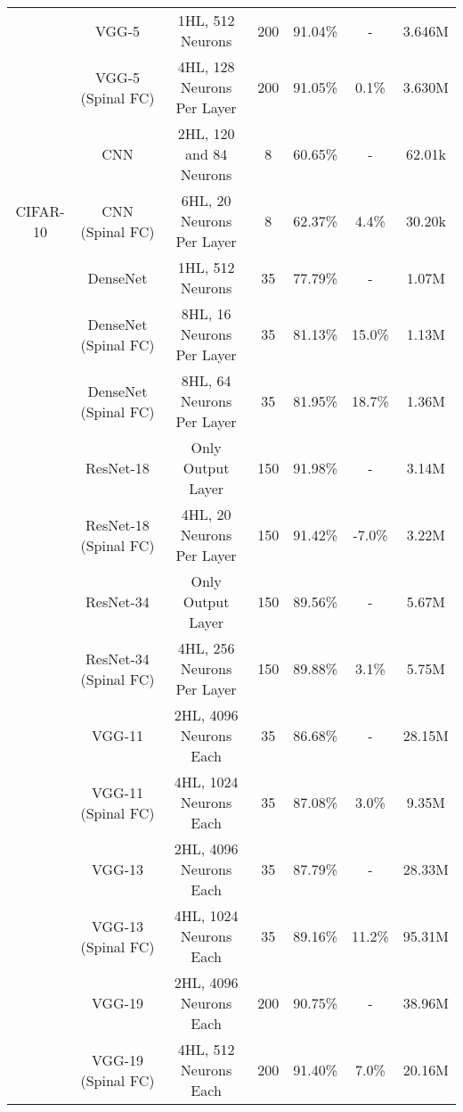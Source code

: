 \documentclass[journal]{IEEEtran}
\begin{document}
\begin{table*}
\begin{tabular}{|c|c|c|c|c|c|c|}
      & VGG-5\cite{VGG5} & 1HL, 512 Neurons &200 &91.04\%&- &3.646M\\ \cline{2-7}
      & VGG-5 (Spinal FC) & 4HL, 128 Neurons Per Layer & 200 &91.05\% & 0.1\% &3.630M\\ \hline \hline
      
      
      
      
      
      
      
      
      
      
      & CNN\cite{CR_CNN2}& 2HL, 120 and 84 Neurons & 8 &60.65\% &- &62.01k\\ \cline{2-7}
CIFAR-10      & CNN (Spinal FC) & 6HL, 20 Neurons Per Layer& 8 &62.37\%&4.4\% &30.20k\\ \cline{2-7}
      
 \cite{krizhevsky2009learning}  & DenseNet\cite{DenseNet_code} & 1HL, 512 Neurons& 35 &77.79\%&- & 1.07M \\ \cline{2-7}  
      & DenseNet (Spinal FC) &8HL, 16 Neurons Per Layer& 35 &81.13\%&15.0\% &1.13M\\ \cline{2-7}  
 & DenseNet (Spinal FC) &8HL, 64 Neurons Per Layer& 35 &81.95\%&18.7\% & 1.36M\\ \cline{2-7} 
      
 
   & ResNet-18 \cite{he2016deep}&Only Output Layer&150 &91.98\%&- &3.14M\\ \cline{2-7}
 & ResNet-18 (Spinal FC) & 4HL, 20 Neurons Per Layer &150 &91.42\%  & -7.0\% &3.22M\\ \cline{2-7}
    & ResNet-34 \cite{he2016deep}&Only Output Layer&150 &89.56\%&- &5.67M \\ \cline{2-7}
 & ResNet-34 (Spinal FC) & 4HL, 256 Neurons Per Layer &150 &89.88\%  & 3.1\% &5.75M\\ \cline{2-7}
& VGG-11\cite{simonyan2014very} & 2HL, 4096 Neurons Each &35 &86.68\% &- &28.15M\\ \cline{2-7} 
    & VGG-11 (Spinal FC) &4HL, 1024 Neurons Each &35 &87.08\%&3.0\% &9.35M\\ \cline{2-7} 

    & VGG-13\cite{simonyan2014very} & 2HL, 4096 Neurons Each &35 &87.79\% &- &28.33M\\ \cline{2-7} 
    & VGG-13 (Spinal FC) &4HL, 1024 Neurons Each &35 &89.16\%&11.2\% &95.31M \\ \cline{2-7}      
      & VGG-19\cite{simonyan2014very} & 2HL, 4096 Neurons Each &200 &90.75\% &-&38.96M\\ \cline{2-7} 
    & VGG-19 (Spinal FC) &4HL, 512 Neurons Each &200 &91.40\%&7.0\% & 20.16M\\ \hline \hline 
      

\end{tabular}
\end{table*}
\end{document}
